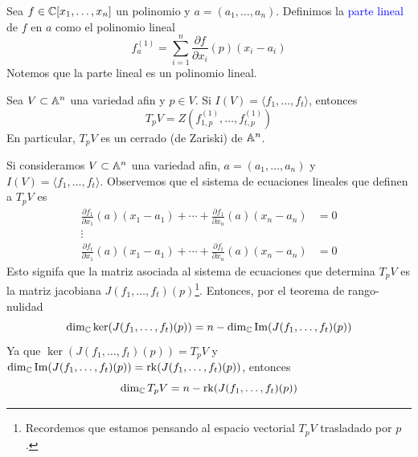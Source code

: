 \begin{definition}
    Sea $f\in\mathbb{C}[x_1,\dots,x_n]$ un polinomio y $a=(a_1,\dots,a_n)$. Definimos la \textcolor{blue}{parte lineal} de $f$ en $a$ como el polinomio lineal
    \begin{equation*}
        f^{(1)}_a=\sum_{i=1}^n\frac{\partial f}{\partial x_i}(p)(x_i-a_i)
    \end{equation*}
    Notemos que la parte lineal es un polinomio lineal.
\end{definition}

\begin{lemma}
    Sea $V\subset\mathbb{A}^n$ una variedad afin y $p\in V$. Si $I(V)=\langle f_1,\dots,f_t\rangle$, entonces
    \begin{equation*}
        T_pV=Z(f^{(1)}_{1,p},\dots,f^{(1)}_{t,p})
    \end{equation*}
    En particular, $T_pV$ es un cerrado (de Zariski) de $\mathbb{A}^n$.
\end{lemma}

\begin{remark}
    Si consideramos $V\subset\mathbb{A}^n$ una variedad afin, $a=(a_1,\dots,a_n)$ y $I(V)=\langle f_1,\dots,f_t\rangle$. Observemos que el sistema de ecuaciones lineales que definen a $T_pV$ es 
    \begin{align*}
            \frac{\partial f_1}{\partial x_1}(a)(x_1-a_1)+\cdots+\frac{\partial f_1}{\partial x_n}(a)(x_n-a_n)&=0\\
            \vdots&\\
            \frac{\partial f_t}{\partial x_1}(a)(x_1-a_1)+\cdots+\frac{\partial f_t}{\partial x_n}(a)(x_n-a_n)&=0
    \end{align*}
    Esto signifa que la matriz asociada al sistema de ecuaciones que determina $T_pV$ es la matriz jacobiana $J(f_1,\dots,f_t)(p)$\footnote{Recordemos que estamos pensando al espacio vectorial $T_pV$ trasladado por $p$.}. Entonces, por el teorema de rango-nulidad
    \begin{equation*}
        \dim_{\mathbb{C}}\ker(J(f_1,\dots,f_t)(p))=n-\dim_{\mathbb{C}}\mathrm{Im}(J(f_1,\dots,f_t)(p))
    \end{equation*}
    Ya que $\ker(J(f_1,\dots,f_t)(p))=T_pV$ y $\dim_{\mathbb{C}}\mathrm{Im}(J(f_1,\dots,f_t)(p))=\mathrm{rk}(J(f_1,\dots,f_t)(p))$, entonces
    \begin{equation*}
        \dim_{\mathbb{C}} T_pV=n-\mathrm{rk}(J(f_1,\dots,f_t)(p))
    \end{equation*}
\end{remark}

